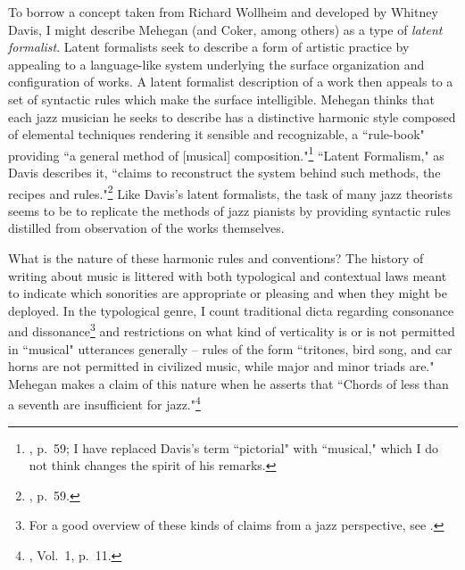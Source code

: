 To borrow a concept taken from Richard Wollheim and developed by Whitney Davis, I might describe Mehegan (and Coker, among others) as a type of \emph{latent formalist}.  Latent formalists seek to describe a form of artistic practice by appealing to a language-like system underlying the surface organization and configuration of works.  A latent formalist description of a work then appeals to a set of syntactic rules which make the surface intelligible.  Mehegan thinks that each jazz musician he seeks to describe has a distinctive harmonic style composed of elemental techniques rendering it sensible and recognizable, a ``rule-book" providing ``a general method of [musical] composition."\footnote{\cite{davis2011}, p.\ 59; I have replaced Davis's term ``pictorial" with ``musical," which I do not think changes the spirit of his remarks.}  ``Latent Formalism," as Davis describes it, ``claims to reconstruct the system behind such methods, the recipes and rules."\footnote{\cite{davis2011}, p.\ 59.}  Like Davis's latent formalists, the task of many jazz theorists seems to be to replicate the methods of jazz pianists by providing syntactic rules distilled from observation of the works themselves.

What is the nature of these harmonic rules and conventions?  The history of writing about music is littered with both typological and contextual laws meant to indicate which sonorities are appropriate or pleasing and when they might be deployed.  In the typological genre, I count traditional dicta regarding consonance and dissonance\footnote{For a good overview of these kinds of claims from a jazz perspective, see \cite{mcgowan2008}.} and restrictions on what kind of verticality is or is not permitted in ``musical" utterances generally -- rules of the form ``tritones, bird song, and car horns are not permitted in civilized music, while major and minor triads are."  Mehegan makes a claim of this nature when he asserts that ``Chords of less than a seventh are insufficient for jazz."\footnote{\cite{mehegan1959}, Vol.\ 1, p.\ 11.}

